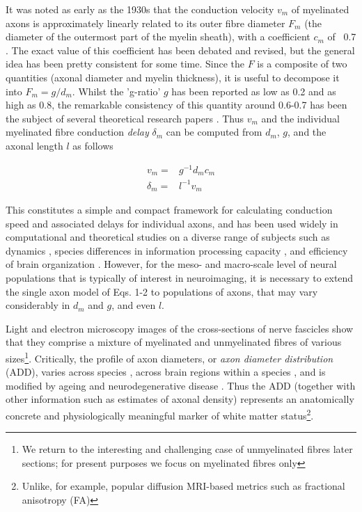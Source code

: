 It was noted as early as the 1930s that the conduction velocity $v_m$ of myelinated axons is approximately linearly related to its outer fibre diameter $F_m$ (the diameter of the outermost part of the myelin sheath), with a coefficient $c_m$ of ~0.7  . The exact value of this coefficient has been debated and revised, but the general idea has been pretty consistent for some time. Since the $F$ is a composite of two quantities (axonal diameter and myelin thickness), it is useful to decompose it into $F_m = g/d_m$. Whilst the 'g-ratio' $g$ has been reported as low as 0.2 and as high as 0.8, the remarkable consistency of this quantity around 0.6-0.7 has been the subject of several theoretical research papers 
. Thus $v_m$ and the individual myelinated fibre conduction \textit{delay} $\delta_m$ can be computed from $d_m$, $g$, and the axonal length $l$ as follows

\begin{eqnarray}
v_m      =& g^{-1} d_m c_m \\
\delta_m =& l^{-1} v_m
\end{eqnarray}




This constitutes a simple and compact framework for calculating conduction speed and associated delays for individual axons, and has been used widely in computational and theoretical studies on a diverse range of subjects such as dynamics , species differences in information processing capacity \cite{caminiti2009evolution}, and efficiency of brain organization . However, for the meso- and macro-scale level of neural populations that is typically of interest in neuroimaging, it is necessary to extend the single axon model of Eqs. 1-2 to  populations of axons, that may vary considerably in $d_m$ and $g$, and even $l$. 

Light and electron microscopy images of the cross-sections of nerve fascicles show that they comprise a mixture of myelinated and unmyelinated fibres of various sizes\footnote{We return to the interesting and challenging case of unmyelinated fibres later sections; for present purposes we focus on myelinated fibres only}. Critically, the profile of axon diameters, or \textit{axon diameter distribution} (ADD), varies across species \cite{caminiti2013diameter}, across brain regions within a species \cite{aboitiz1992fiber,innocenti2010fiber}, and is modified by ageing and neurodegenerative disease . Thus the ADD (together with other information such as estimates of axonal density) represents an anatomically concrete and physiologically meaningful marker of white matter status\footnote{Unlike, for example, popular diffusion MRI-based metrics such as fractional anisotropy (FA)}. 

